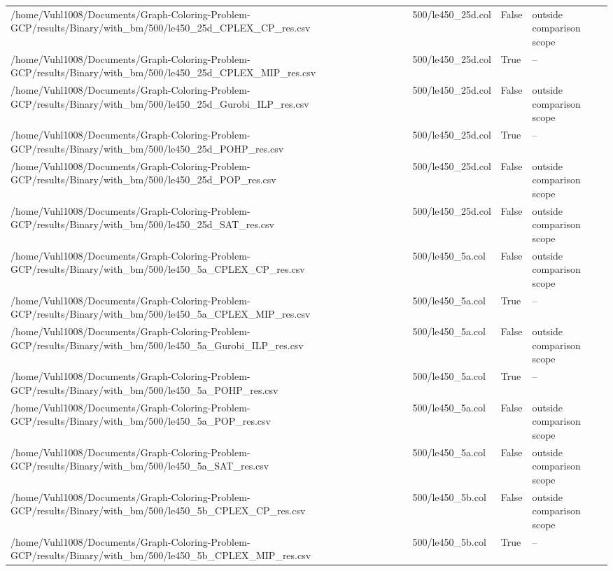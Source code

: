 \begin{table}[htbp]
\begin{tabular}{llll}
/home/Vuhl1008/Documents/Graph-Coloring-Problem-GCP/results/Binary/with\_bm/500/le450\_25d\_CPLEX\_CP\_res.csv & 500/le450\_25d.col & False & outside comparison scope \\
/home/Vuhl1008/Documents/Graph-Coloring-Problem-GCP/results/Binary/with\_bm/500/le450\_25d\_CPLEX\_MIP\_res.csv & 500/le450\_25d.col & True & -- \\
/home/Vuhl1008/Documents/Graph-Coloring-Problem-GCP/results/Binary/with\_bm/500/le450\_25d\_Gurobi\_ILP\_res.csv & 500/le450\_25d.col & False & outside comparison scope \\
/home/Vuhl1008/Documents/Graph-Coloring-Problem-GCP/results/Binary/with\_bm/500/le450\_25d\_POHP\_res.csv & 500/le450\_25d.col & True & -- \\
/home/Vuhl1008/Documents/Graph-Coloring-Problem-GCP/results/Binary/with\_bm/500/le450\_25d\_POP\_res.csv & 500/le450\_25d.col & False & outside comparison scope \\
/home/Vuhl1008/Documents/Graph-Coloring-Problem-GCP/results/Binary/with\_bm/500/le450\_25d\_SAT\_res.csv & 500/le450\_25d.col & False & outside comparison scope \\
/home/Vuhl1008/Documents/Graph-Coloring-Problem-GCP/results/Binary/with\_bm/500/le450\_5a\_CPLEX\_CP\_res.csv & 500/le450\_5a.col & False & outside comparison scope \\
/home/Vuhl1008/Documents/Graph-Coloring-Problem-GCP/results/Binary/with\_bm/500/le450\_5a\_CPLEX\_MIP\_res.csv & 500/le450\_5a.col & True & -- \\
/home/Vuhl1008/Documents/Graph-Coloring-Problem-GCP/results/Binary/with\_bm/500/le450\_5a\_Gurobi\_ILP\_res.csv & 500/le450\_5a.col & False & outside comparison scope \\
/home/Vuhl1008/Documents/Graph-Coloring-Problem-GCP/results/Binary/with\_bm/500/le450\_5a\_POHP\_res.csv & 500/le450\_5a.col & True & -- \\
/home/Vuhl1008/Documents/Graph-Coloring-Problem-GCP/results/Binary/with\_bm/500/le450\_5a\_POP\_res.csv & 500/le450\_5a.col & False & outside comparison scope \\
/home/Vuhl1008/Documents/Graph-Coloring-Problem-GCP/results/Binary/with\_bm/500/le450\_5a\_SAT\_res.csv & 500/le450\_5a.col & False & outside comparison scope \\
/home/Vuhl1008/Documents/Graph-Coloring-Problem-GCP/results/Binary/with\_bm/500/le450\_5b\_CPLEX\_CP\_res.csv & 500/le450\_5b.col & False & outside comparison scope \\
/home/Vuhl1008/Documents/Graph-Coloring-Problem-GCP/results/Binary/with\_bm/500/le450\_5b\_CPLEX\_MIP\_res.csv & 500/le450\_5b.col & True & -- \\

\end{tabular}
\end{table}
